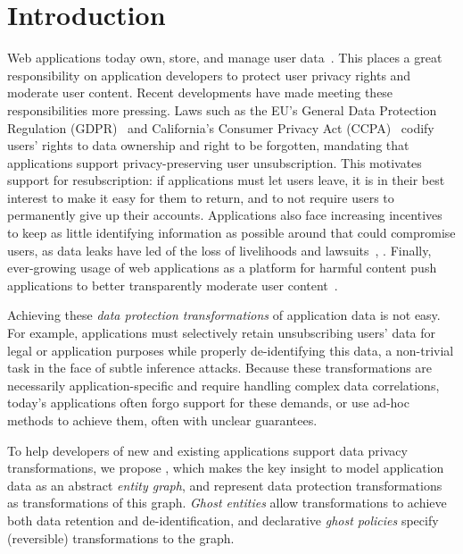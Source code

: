 \section{Introduction}
Web applications today own, store, and manage user data~\cite{nytimes:fb, npr:data}. 
This places a great responsibility on application developers to protect user privacy rights
and moderate user content.
%
Recent developments have made meeting these responsibilities more pressing.  Laws such as the EU's
General Data Protection Regulation (GDPR)~\cite{eu:gdpr} and California's Consumer Privacy Act
(CCPA)~\cite{ca:privacy-act} codify users' rights to data ownership and right to be forgotten,
mandating that applications support privacy-preserving user unsubscription. This motivates support
for resubscription: if applications must let users leave, it is in their best interest to make it
easy for them to return, and to not require users to permanently give up their accounts.
%
Applications also face increasing incentives to keep as little identifying information as possible
around that could compromise users, as data leaks have led of the loss of livelihoods and
lawsuits~\cite{breach:amazon,breach:twitter, breach:fb, breach:marriott, breach:quora}, .
%
Finally, ever-growing usage of web applications as a platform for harmful content push 
applications to better transparently moderate user content~\cite{contentmod, sasb}.

Achieving these \emph{data protection transformations} of application data is not easy.
For example, applications must selectively retain unsubscribing users' data for legal or application purposes while properly
de-identifying this data, a non-trivial task in the face of subtle inference attacks.
Because these transformations are necessarily application-specific and require handling complex data
correlations, today's applications often forgo support for these demands, or use ad-hoc methods to
achieve them, often with unclear guarantees.

To help developers of new and existing applications support data privacy transformations, we propose
\sys, which makes the key insight to model application data as an abstract \emph{entity graph}, and
represent data protection transformations as transformations of this graph.  \emph{Ghost entities}
allow transformations to achieve both data retention and de-identification, and declarative
\emph{ghost policies} specify (reversible) transformations to the graph.

